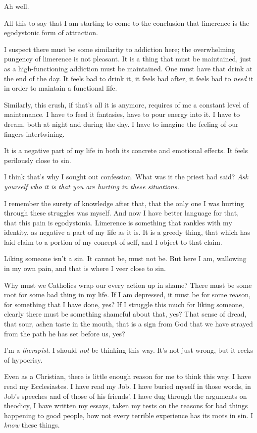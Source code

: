 Ah well.

All this to say that I am starting to come to the conclusion that limerence is the egodystonic form of attraction.

I suspect there must be some similarity to addiction here; the overwhelming pungency of limerence is not pleasant. It is a thing that must be maintained, just as a high-functioning addiction must be maintained. One must have that drink at the end of the day. It feels bad to drink it, it feels bad after, it feels bad to \emph{need} it in order to maintain a functional life.

Similarly, this crush, if that's all it is anymore, requires of me a constant level of maintenance. I have to feed it fantasies, have to pour energy into it. I have to dream, both at night and during the day. I have to imagine the feeling of our fingers intertwining.

It is a negative part of my life in both its concrete and emotional effects. It feels perilously close to sin.

I think that's why I sought out confession. What was it the priest had said? \emph{Ask yourself who it is that you are hurting in these situations.}

I remember the surety of knowledge after that, that the only one I was hurting through these struggles was myself. And now I have better language for that, that this pain is egodystonia. Limerence is something that rankles with my identity, as negative a part of my life as it is. It is a greedy thing, that which has laid claim to a portion of my concept of self, and I object to that claim.

Liking someone isn't a sin. It cannot be, must not be. But here I am, wallowing in my own pain, and that is where I veer close to sin.

Why must we Catholics wrap our every action up in shame? There must be some root for some bad thing in my life. If I am depressed, it must be for some reason, for something that I have done, yes? If I struggle this much for liking someone, clearly there must be something shameful about that, yes? That sense of dread, that sour, ashen taste in the mouth, that is a sign from God that we have strayed from the path he has set before us, yes?

I'm a \emph{therapist}. I should \emph{not} be thinking this way. It's not just wrong, but it reeks of hypocrisy.

Even as a Christian, there is little enough reason for me to think this way. I have read my Ecclesiastes. I have read my Job. I have buried myself in those words, in Job's speeches and of those of his friends'. I have dug through the arguments on theodicy, I have written my essays, taken my tests on the reasons for bad things happening to good people, how not every terrible experience has its roots in sin. I \emph{know} these things.

